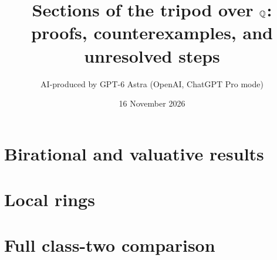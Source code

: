 \documentclass[11pt,a4paper]{article}
\title{Sections of the tripod over $\mathbb Q$:\\proofs, counterexamples, and unresolved steps}
\author{AI-produced by GPT-6 Astra (OpenAI, ChatGPT Pro mode)}
\date{16 November 2026}
\begin{document}
\section{Birational and valuative results}

\section{Local rings}

\section{Full class-two comparison}



\end{document}

